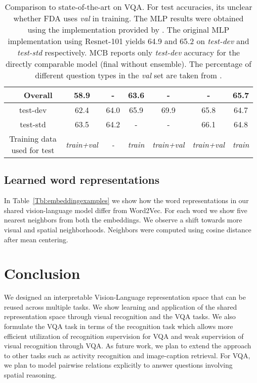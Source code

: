 \documentclass[10pt,twocolumn,letterpaper]{article}
\begin{document}
\begin{table}[]
{\begin{tabular}{|c|c|c|c|c|c|c|c|}
                     & Overall                                                                       & 58.9         & -    & 63.6  & -  & -  & 65.7 \\ \hline 
\multicolumn{2}{|c|}{test-dev}                                                                       & 62.4           & 64.0 & 65.9  & 69.9 & 65.8 & 64.7                      \\
\multicolumn{2}{|c|}{test-std}                                                                       & 63.5          & 64.2 & -  & -    & 66.1 & 64.8          \\ \hline
\multicolumn{2}{|c|}{Training data used for test}                                                                       & \textit{train+val}          & \textit{-} & \textit{train}  & \textit{train+val}    & \textit{train+val} & \textit{train}          \\\hline
\end{tabular}}

\caption{Comparison to state-of-the-art on VQA. For test accuracies, its unclear whether FDA uses \textit{val} in training. The MLP results were obtained using the implementation provided by \cite{mallya2016simplevqa}. The original MLP implementation \cite{jabri2016revisiting} using Resnet-101  yields 64.9 and 65.2 on \textit{test-dev} and \textit{test-std} respectively. MCB reports only \textit{test-dev} accuracy for the directly comparable model (final without ensemble). The percentage of different question types in the \textit{val} set are taken from \cite{shih2016look}.}
\vspace{-1 cm}
\label{tab:state_art}
\end{table}

\subsection{Learned word representations}
In Table~\ref{Tbl:embeddingexamples} we show how the word representations in our shared vision-language model differ from Word2Vec. For each word we show five nearest neighbors from both the embeddings. We observe a shift towards more visual and spatial neighborhoods. Neighbors were computed using cosine distance after mean centering. 

\section{Conclusion}
We designed an interpretable Vision-Language representation space that can be reused across multiple tasks. We show learning and application of the shared representation space through visual recognition and the VQA tasks. We also formulate the VQA task in terms of the recognition task which allows more efficient utilization of recognition supervision for VQA and weak supervision of visual recognition through VQA. As future work, we plan to extend the approach to other tasks such as activity recognition and image-caption retrieval. For VQA, we plan to model pairwise relations explicitly to answer questions involving spatial reasoning. 
{\small


}
\end{document}
